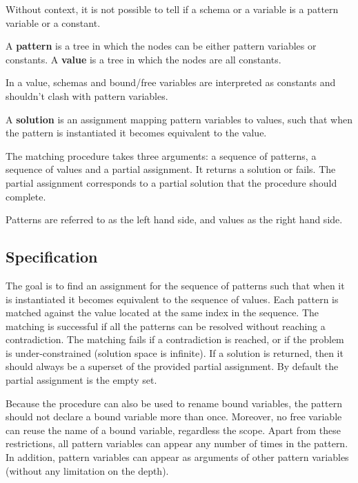 Without context, it is not possible to tell if a schema or a variable is a pattern variable or a constant.

\begin{definition}
A \textbf{pattern} is a tree in which the nodes can be either pattern variables or constants.
A \textbf{value} is a tree in which the nodes are all constants.
\end{definition}

In a value, schemas and bound/free variables are interpreted as constants and shouldn't clash with pattern variables.

\begin{definition}
A \textbf{solution} is an assignment mapping pattern variables to values, such that when the pattern is instantiated it becomes equivalent to the value.
\end{definition}

The matching procedure takes three arguments: a sequence of patterns, a sequence of values and a partial assignment. It returns a solution or fails. The partial assignment corresponds to a partial solution that the procedure should complete.

Patterns are referred to as the left hand side, and values as the right hand side.

\subsection{Specification}

The goal is to find an assignment for the sequence of patterns such that when it is instantiated it becomes equivalent to the sequence of values. Each pattern is matched against the value located at the same index in the sequence. The matching is successful if all the patterns can be resolved without reaching a contradiction. The matching fails if a contradiction is reached, or if the problem is under-constrained (solution space is infinite). If a solution is returned, then it should always be a superset of the provided partial assignment. By default the partial assignment is the empty set.

Because the procedure can also be used to rename bound variables, the pattern should not declare a bound variable more than once. Moreover, no free variable can reuse the name of a bound variable, regardless the scope. Apart from these restrictions, all pattern variables can appear any number of times in the pattern. In addition, pattern variables can appear as arguments of other pattern variables (without any limitation on the depth).

